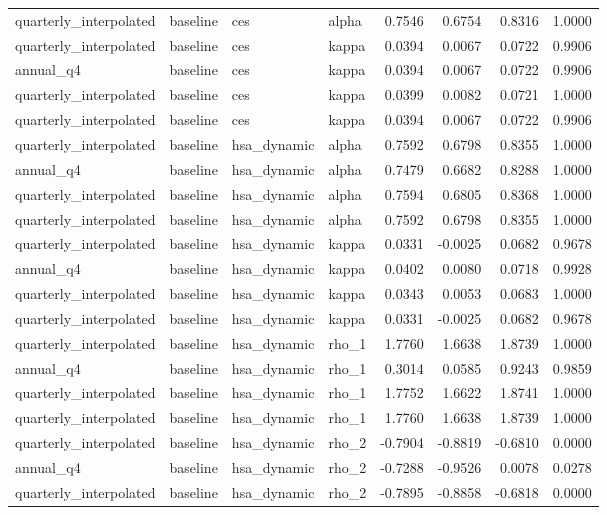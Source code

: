 \begin{tabular}{llllrrrr}
quarterly\_interpolated & baseline & ces & alpha & 0.7546 & 0.6754 & 0.8316 & 1.0000 \\
quarterly\_interpolated & baseline & ces & kappa & 0.0394 & 0.0067 & 0.0722 & 0.9906 \\
annual\_q4 & baseline & ces & kappa & 0.0394 & 0.0067 & 0.0722 & 0.9906 \\
quarterly\_interpolated & baseline & ces & kappa & 0.0399 & 0.0082 & 0.0721 & 1.0000 \\
quarterly\_interpolated & baseline & ces & kappa & 0.0394 & 0.0067 & 0.0722 & 0.9906 \\
quarterly\_interpolated & baseline & hsa\_dynamic & alpha & 0.7592 & 0.6798 & 0.8355 & 1.0000 \\
annual\_q4 & baseline & hsa\_dynamic & alpha & 0.7479 & 0.6682 & 0.8288 & 1.0000 \\
quarterly\_interpolated & baseline & hsa\_dynamic & alpha & 0.7594 & 0.6805 & 0.8368 & 1.0000 \\
quarterly\_interpolated & baseline & hsa\_dynamic & alpha & 0.7592 & 0.6798 & 0.8355 & 1.0000 \\
quarterly\_interpolated & baseline & hsa\_dynamic & kappa & 0.0331 & -0.0025 & 0.0682 & 0.9678 \\
annual\_q4 & baseline & hsa\_dynamic & kappa & 0.0402 & 0.0080 & 0.0718 & 0.9928 \\
quarterly\_interpolated & baseline & hsa\_dynamic & kappa & 0.0343 & 0.0053 & 0.0683 & 1.0000 \\
quarterly\_interpolated & baseline & hsa\_dynamic & kappa & 0.0331 & -0.0025 & 0.0682 & 0.9678 \\
quarterly\_interpolated & baseline & hsa\_dynamic & rho\_1 & 1.7760 & 1.6638 & 1.8739 & 1.0000 \\
annual\_q4 & baseline & hsa\_dynamic & rho\_1 & 0.3014 & 0.0585 & 0.9243 & 0.9859 \\
quarterly\_interpolated & baseline & hsa\_dynamic & rho\_1 & 1.7752 & 1.6622 & 1.8741 & 1.0000 \\
quarterly\_interpolated & baseline & hsa\_dynamic & rho\_1 & 1.7760 & 1.6638 & 1.8739 & 1.0000 \\
quarterly\_interpolated & baseline & hsa\_dynamic & rho\_2 & -0.7904 & -0.8819 & -0.6810 & 0.0000 \\
annual\_q4 & baseline & hsa\_dynamic & rho\_2 & -0.7288 & -0.9526 & 0.0078 & 0.0278 \\
quarterly\_interpolated & baseline & hsa\_dynamic & rho\_2 & -0.7895 & -0.8858 & -0.6818 & 0.0000 \\

\end{tabular}
